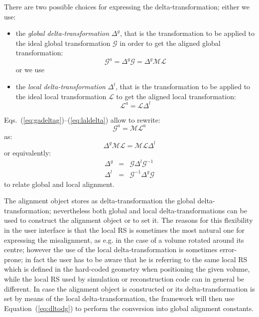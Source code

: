 \documentclass[12pt,a4paper,twoside]{article}
\begin{document}
{There are two possible choices for expressing the
delta-transformation; either we use:
\begin{itemize}
\item the \emph{global delta-transformation} $\Delta^g$, that is the
  transformation to be applied to the ideal global transformation
  $\mathcal{G}$ in order to get the aligned global transformation:
  \begin{equation}\label{eq:gadeltag}
     \mathcal{G}^a=\Delta^g\mathcal{G}=\Delta^g\mathcal{M}\mathcal{L}
  \end{equation}
  or we use
\item the \emph{local delta-transformation} $\Delta^l$, that is the
  transformation to be applied to the ideal local transformation
  $\mathcal{L}$ to get the aligned local transformation:
  \begin{equation}\label{eq:laldelta}
    \mathcal{L}^a=\mathcal{L}\Delta^l
  \end{equation}
\end{itemize}

Eqs.~(\ref{eq:gadeltag})--(\ref{eq:laldelta}) allow to rewrite:
  \begin{equation} %
    \mathcal{G}^a=\mathcal{M}\mathcal{L}^a
  \end{equation}
as:
\begin{equation}
\label{eq:localal}
 \Delta^g\mathcal{M}\mathcal{L}=\mathcal{M}\mathcal{L}\Delta^l
\end{equation}
or equivalently:
\begin{eqnarray}
\Delta^g &=& \mathcal{G}\Delta^l\mathcal{G}^{-1} \label{eq:dltodg}\\
\Delta^l &=& \mathcal{G}^{-1}\Delta^g\mathcal{G} \label{eq:dgtodl}
\end{eqnarray}
to relate global and local alignment.

The alignment object stores as delta-transformation the global
delta-transformation; nevertheless both global and local
delta-transformations can be used to construct the alignment object or
to set it.  The reasons for this flexibility in the user interface
is that the local RS is sometimes the most natural one for expressing the
misalignment, as e.g. in the case of a volume rotated around its
centre; however the use of the local delta-transformation is sometimes
error-prone; in fact the user has to be aware that he is referring to
the same local RS which is defined in the hard-coded geometry when
positioning the given volume, while the local RS used by simulation or
reconstruction code can in general be different.  In case the
alignment object is constructed or its delta-transformation is set by
means of the local delta-transformation, the framework will then use
Equation~(\ref{eq:dltodg}) to perform the conversion into global
alignment constants.

}
\end{document}
